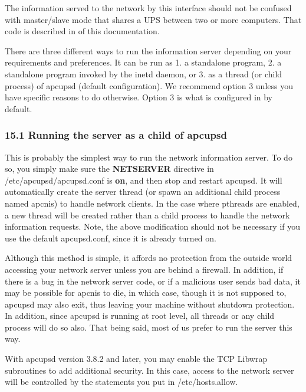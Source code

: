 The information served to the network by this interface should not be confused
with master/slave mode that shares a UPS between two or more computers. That
code is described in 
 of this
documentation.  

There are three different ways to run the information server depending on your
requirements and preferences. It can be run as 1.  a standalone program, 2. a
standalone program invoked by the inetd daemon, or 3. as a thread (or child
process) of apcupsd (default configuration). We recommend option 3 unless you
have specific reasons to do otherwise. Option 3 is what is configured in by
default. 

\label{Running-the-server-as-a-child-of-apcupsd}

\subsubsection*{15.1 Running the server as a child of apcupsd}

This is probably the simplest way to run the network information server. To do
so, you simply make sure the {\bf NETSERVER} directive in
/etc/apcupsd/apcupsd.conf is {\bf on}, and then stop and restart apcupsd. It
will automatically create the server thread (or spawn an additional child
process named apcnis) to handle network clients. In the case where pthreads
are enabled, a new thread will be created rather than a child process to
handle the network information requests. Note, the above modification should
not be necessary if you use the default apcupsd.conf, since it is already
turned on.  

Although this method is simple, it affords no protection from the outside
world accessing your network server unless you are behind a firewall. In
addition, if there is a bug in the network server code, or if a malicious user
sends bad data, it may be possible for apcnis to die, in which case, though it
is not supposed to, apcupsd may also exit, thus leaving your machine without
shutdown protection. In addition, since apcupsd is running at root level, all
threads or any child process will do so also. That being said, most of us
prefer to run the server this way.  

With apcupsd version 3.8.2 and later, you may enable the TCP Libwrap
subroutines to add additional security. In this case, access to the network
server will be controlled by the statements you put in /etc/hosts.allow. 

